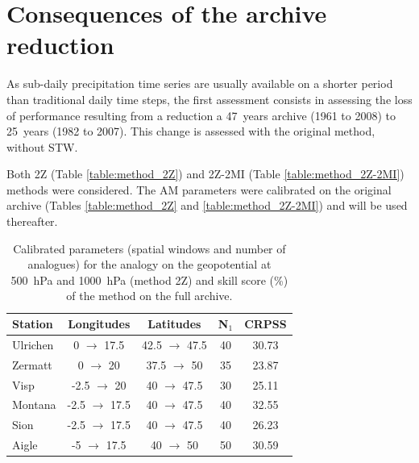 \documentclass[hess]{copernicus}
\begin{document}
\section{Consequences of the archive reduction}

As sub-daily precipitation time series are usually available on a shorter period than traditional daily time steps, the first assessment consists in assessing the loss of performance resulting from a reduction a 47~years archive (1961 to 2008) to 25~years (1982 to 2007). This change is assessed with the original method, without STW.

Both 2Z (Table \ref{table:method_2Z}) and 2Z-2MI (Table \ref{table:method_2Z-2MI}) methods were considered. The AM parameters were calibrated on the original archive (Tables \ref{table:method_2Z} and \ref{table:method_2Z-2MI}) and will be used thereafter.

\begin{table}[htb]
	\caption{Calibrated parameters (spatial windows and number of analogues) for the analogy on the geopotential at 500~hPa and 1000~hPa (method 2Z) and skill score (\%) of the method on the full archive.}
	\begin{center}
		\begin{tabular}{l c c c c }
			\hline
			\textbf{Station} & \textbf{Longitudes} & \textbf{Latitudes} & \textbf{N$_{1}$} & \textbf{CRPSS} \\
			\hline
			Ulrichen & 0 $\rightarrow$ 17.5 & 42.5 $\rightarrow$ 47.5 & 40 & 30.73 \\
			Zermatt & 0 $\rightarrow$ 20 & 37.5 $\rightarrow$ 50 & 35 & 23.87 \\
			Visp & -2.5 $\rightarrow$ 20 & 40 $\rightarrow$ 47.5 & 30 & 25.11 \\
			Montana & -2.5 $\rightarrow$ 17.5 & 40 $\rightarrow$ 47.5 & 40 & 32.55 \\
			Sion & -2.5 $\rightarrow$ 17.5 & 40 $\rightarrow$ 47.5 & 40 & 26.23 \\
			Aigle & -5 $\rightarrow$ 17.5 & 40 $\rightarrow$ 50 & 50 & 30.59 \\ 
			\hline
		\end{tabular}
	\end{center}
	\label{table:params_2Z}
\end{table}
\end{document}
